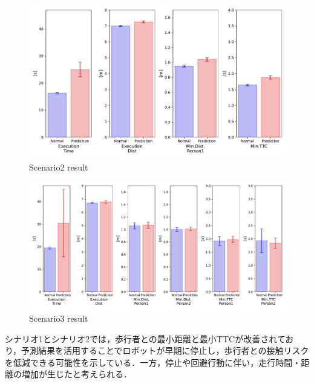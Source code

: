 \vspace*{20pt}
\begin{figure}[H]
  \centering
 \includegraphics[keepaspectratio, scale=0.53]
      {images/scenario2_result.pdf}
  \caption{Scenario2 result}
 \label{Fig:scenario2-result}
\end{figure} 

\begin{figure}[H]
  \centering
 \includegraphics[keepaspectratio, scale=0.44]
      {images/scenario3_result.pdf}
  \caption{Scenario3 result}
 \label{Fig:scenario3-result}
\end{figure} 

\newpage

シナリオ1とシナリオ2では，歩行者との最小距離と最小TTCが改善されており，予測結果を活用することでロボットが早期に停止し，歩行者との接触リスクを低減できる可能性を示している．一方，停止や回避行動に伴い，走行時間・距離の増加が生じたと考えられる．

